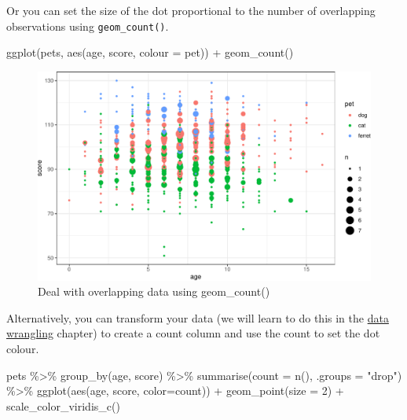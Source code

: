 \documentclass[
  oneside]{book}
\newenvironment{Shaded}{\begin{snugshade}}{\end{snugshade}}
\newcommand{\AttributeTok}[1]{\textcolor[rgb]{0.77,0.63,0.00}{#1}}
\newcommand{\DecValTok}[1]{\textcolor[rgb]{0.00,0.00,0.81}{#1}}
\newcommand{\FunctionTok}[1]{\textcolor[rgb]{0.00,0.00,0.00}{#1}}
\newcommand{\NormalTok}[1]{#1}
\newcommand{\SpecialCharTok}[1]{\textcolor[rgb]{0.00,0.00,0.00}{#1}}
\newcommand{\StringTok}[1]{\textcolor[rgb]{0.31,0.60,0.02}{#1}}
\begin{document}
Or you can set the size of the dot proportional to the number of overlapping observations using \texttt{geom\_count()}.

\begin{Shaded}
\begin{Highlighting}[]
\FunctionTok{ggplot}\NormalTok{(pets, }\FunctionTok{aes}\NormalTok{(age, score, }\AttributeTok{colour =}\NormalTok{ pet)) }\SpecialCharTok{+}
  \FunctionTok{geom\_count}\NormalTok{()}
\end{Highlighting}
\end{Shaded}

\begin{figure}

{\centering \includegraphics[width=0.9\linewidth]{images/overlap-size-1} 

}

\caption{Deal with overlapping data using geom_count()}\label{fig:overlap-size}
\end{figure}

Alternatively, you can transform your data (we will learn to do this in the \protect\hyperlink{dplyr}{data wrangling} chapter) to create a count column and use the count to set the dot colour.

\begin{Shaded}
\begin{Highlighting}[]
\NormalTok{pets }\SpecialCharTok{\%\textgreater{}\%}
  \FunctionTok{group\_by}\NormalTok{(age, score) }\SpecialCharTok{\%\textgreater{}\%}
  \FunctionTok{summarise}\NormalTok{(}\AttributeTok{count =} \FunctionTok{n}\NormalTok{(), }\AttributeTok{.groups =} \StringTok{"drop"}\NormalTok{) }\SpecialCharTok{\%\textgreater{}\%}
  \FunctionTok{ggplot}\NormalTok{(}\FunctionTok{aes}\NormalTok{(age, score, }\AttributeTok{color=}\NormalTok{count)) }\SpecialCharTok{+}
  \FunctionTok{geom\_point}\NormalTok{(}\AttributeTok{size =} \DecValTok{2}\NormalTok{) }\SpecialCharTok{+}
  \FunctionTok{scale\_color\_viridis\_c}\NormalTok{()}
\end{Highlighting}
\end{Shaded}
\end{document}
